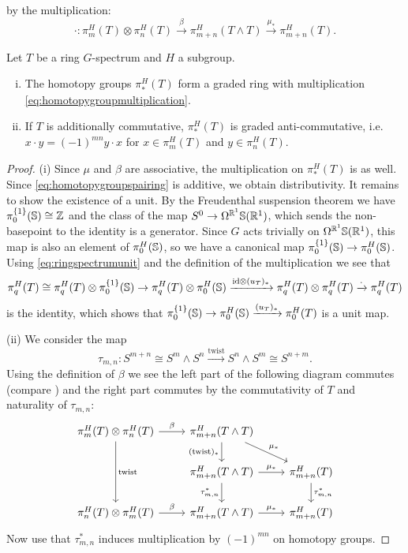by the multiplication:
\begin{equation}\label{eq:homotopygroupmultiplication}
\cdot:\pi_m^H(T)\otimes \pi_n^H(T)\xrightarrow{\beta}\pi_{m+n}^H(T\wedge T)
\xrightarrow{\mu_\ast} \pi_{m+n}^H(T).
\end{equation}
\begin{prop}
Let $T$ be a ring $G$-spectrum and $H$ a subgroup.
\begin{enumerate}[(i)]
\item The homotopy groups $\pi_\ast^H(T)$
form a graded ring with multiplication \eqref{eq:homotopygroupmultiplication}.
\item If $T$ is additionally commutative, $\pi_\ast^H(T)$ is graded anti-commutative,
i.e. $x\cdot y = (-1)^{mn}y\cdot x$ for $x\in \pi_m^H(T)$ and $y\in \pi_n^H(T)$.
\end{enumerate}
\end{prop}

\begin{proof}
(i) Since $\mu$ and $\beta$ are associative, the multiplication on $\pi_\ast^H(T)$ is as well. Since \eqref{eq:homotopygroupspairing}
is additive, we obtain distributivity. It remains to show the existence of a unit. By the Freudenthal suspension
theorem we have $\pi_0^{\{1\}}(\mathbb{S})\cong \mathbb{Z}$ and the class of the map
$S^0\to \Omega^{\mathbb{R}^1}\mathbb{S}(\mathbb{R}^1)$, which sends the non-basepoint to the
identity is a generator. Since $G$ acts trivially on $\Omega^{\mathbb{R}^1}\mathbb{S}(\mathbb{R}^1)$,
this map is also an element of $\pi_0^H(\mathbb{S})$, so we have a canonical map
$\pi_0^{\{1\}}(\mathbb{S})\to \pi_0^H(\mathbb{S})$. 
Using \eqref{eq:ringspectrumunit} and the definition of the multiplication
we see that
\[
\pi_q^H(T)\cong \pi_q^H(T)\otimes \pi_0^{\{1\}}(\mathbb{S})
\to  \pi_q^H(T)\otimes \pi_0^H(\mathbb{S})
\xrightarrow{\mathrm{id}\otimes (u_T)_\ast} 
\pi_q^H(T)\otimes \pi_q^H(T) \xrightarrow{\cdot}
\pi_q^H(T)
\]
is the identity, which shows that $\pi_0^{\{1\}}(\mathbb{S})\to \pi_0^H(\mathbb{S})
\xrightarrow{(u_T)_\ast} \pi_0^H(T)$ is a unit map. 

(ii) We consider the map
\[
\tau_{m,n}: S^{m+n}\cong S^m\wedge S^n\xrightarrow{\mathrm{twist}}
S^n\wedge S^m\cong S^{n+m}.
\]
Using the definition of $\beta$ we see the left part of the following diagram commutes
(compare \cite[Proposition~4.29, \pno~39]{schwedeequivariant}) and the right
part commutes by the commutativity of $T$ and naturality of $\tau_{m,n}$:
\[
\begin{tikzcd}
\pi_m^H(T)\otimes \pi_n^H(T)
\arrow{dd}{\mathrm{twist}}
\arrow{r}{\beta}
&\pi_{m+n}^H(T\wedge T)
\arrow[swap]{d}{(\mathrm{twist})_\ast}\arrow{dr}{\mu_\ast}\\
&\pi_{m+n}^H(T\wedge T)
\arrow[swap]{d}{\tau_{m,n}^\ast}\arrow{r}{\mu_\ast}
&\pi^H_{m+n}(T)
\arrow{d}{\tau_{m,n}^\ast}\\
\pi_n^H(T)\otimes \pi_m^H(T)
\arrow{r}{\beta}
&\pi_{m+n}^H(T\wedge T)\arrow{r}{\mu_\ast}
&\pi_{m+n}^H(T)
\end{tikzcd}
\]
Now use that
 $\tau_{m,n}^\ast$ induces multiplication
by $(-1)^{mn}$ on homotopy groups.
\end{proof}


